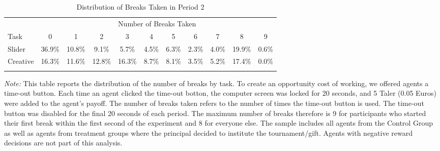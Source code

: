 \begin{table}[h]%
\setlength\tabcolsep{2pt}
\caption{Distribution of Breaks Taken in Period 2}
\label{tab:BreaksDistribution}
\begin{center}%
{\small\renewcommand{\arraystretch}{1}%
\begin{tabular}{lcccccccccc}
\hline\hline\noalign{\smallskip}
 & \multicolumn{10}{c}{Number of Breaks Taken} \\
 \cmidrule{2-11}
Task & \hspace{10pt} 0 \hspace{10pt} & \hspace{10pt} 1 \hspace{10pt} & \hspace{10pt} 2 \hspace{10pt} & \hspace{10pt} 3 \hspace{10pt} & \hspace{10pt} 4 \hspace{10pt} & \hspace{10pt} 5 \hspace{10pt} & \hspace{10pt} 6 \hspace{10pt} & \hspace{10pt} 7 \hspace{10pt} & \hspace{10pt} 8 \hspace{10pt} & \hspace{10pt} 9 \hspace{10pt} \\
\midrule
Slider  & 36.9\% & 10.8\% &  9.1\% &  5.7\% &  4.5\% &  6.3\% &  2.3\% &  4.0\% & 19.9\% &  0.6\%\\Creative  & 16.3\% & 11.6\% & 12.8\% & 16.3\% &  8.7\% &  8.1\% &  3.5\% &  5.2\% & 17.4\% &  0.0\%\\\hline\hline\noalign{\medskip}
\end{tabular}}
\begin{minipage}{\textwidth}
\footnotesize {\it Note:} This table reports the distribution of the number of breaks by task. 
To create an opportunity cost of working, we offered agents a time-out button. Each time an agent clicked the time-out botton, the computer screen was locked for 20 seconds, and 5 Taler (0.05 Euros) were added to the agent's payoff. 
The number of breaks taken refers to the number of times the time-out button is used. 
The time-out button was disabled for the final 20 seconds of each period. The maximum number of breaks therefore is 9 for participants who started their first break within the first second of the experiment and 8 for everyone else. 
The sample includes all agents from the Control Group as well as agents from treatment groups where the principal decided to institute the tournament/gift. Agents with negative reward decisions are not part of this analysis. 
\end{minipage}
\end{center}
\end{table}
